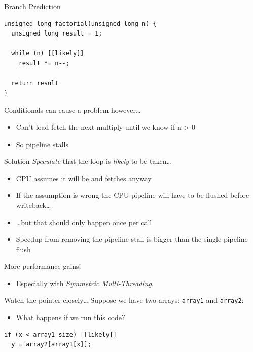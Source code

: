 \documentclass[9pt,aspectratio=169]{beamer}
\begin{document}
\begin{frame}[label={sec:org1872d65},fragile]{Branch Prediction}
 \begin{verbatim}
unsigned long factorial(unsigned long n) {
  unsigned long result = 1;

  while (n) [[likely]]
    result *= n--;

  return result
}
\end{verbatim}

Conditionals can cause a problem however\ldots{}
\begin{itemize}
\item Can't load fetch the next multiply until we know if n > 0
\item So pipeline stalls
\end{itemize}

\begin{block}{Solution}
\emph{Speculate} that the loop is \emph{likely} to be taken\ldots{}
\begin{itemize}
\item CPU assumes it will be and fetches anyway
\item If the assumption is wrong the CPU pipeline will have to be flushed before writeback\ldots{}
\item \ldots{}but that should only happen once per call
\item Speedup from removing the pipeline stall is bigger than the single pipeline flush
\end{itemize}

More performance gains!
\begin{itemize}
\item Especially with \emph{Symmetric Multi-Threading}.
\end{itemize}
\end{block}
\end{frame}

\begin{frame}[label={sec:orgadaf499},fragile]{Watch the pointer closely\ldots{}}
 Suppose we have two arrays: \texttt{array1} and \texttt{array2}:
\begin{itemize}
\item What happens if we run this code?
\end{itemize}

\begin{verbatim}
if (x < array1_size) [[likely]]
  y = array2[array1[x]];
\end{verbatim}
\end{frame}
\end{document}
